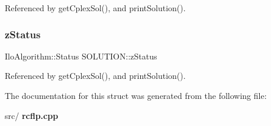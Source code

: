 Referenced by get\+Cplex\+Sol(), and print\+Solution().

\mbox{\label{structSOLUTION_ae81190f94f47fef19ff54ff8461eabd1}} 
\subsubsection{z\+Status}
{\footnotesize\ttfamily Ilo\+Algorithm\+::\+Status S\+O\+L\+U\+T\+I\+O\+N\+::z\+Status}



Referenced by get\+Cplex\+Sol(), and print\+Solution().



The documentation for this struct was generated from the following file\+:\begin{DoxyCompactItemize}
\item 
src/\textbf{ rcflp.\+cpp}\end{DoxyCompactItemize}
